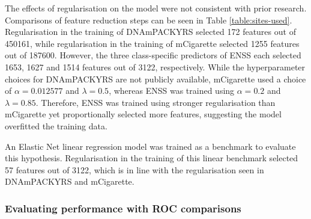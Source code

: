 \documentclass{article} %
\begin{document}
The effects of regularisation on the model were not consistent with prior research. Comparisons of feature reduction steps can be seen in Table \ref{table:sites-used}. Regularisation in the training of DNAmPACKYRS selected 172 features out of \num{450161}, while regularisation in the training of mCigarette selected \num{1255} features out of \num{187600}. However, the three class-specific predictors of ENSS each selected 1653, 1627 and 1514 features out of 3122, respectively. While the hyperparameter choices for DNAmPACKYRS are not publicly available, mCigarette used a choice of \(\alpha = 0.012577\) and \(\lambda = 0.5\), whereas ENSS was trained using \(\alpha = 0.2\) and \(\lambda = 0.85\). Therefore, ENSS was trained using stronger regularisation than mCigarette yet proportionally selected more features, suggesting the model overfitted the training data.

An Elastic Net linear regression model was trained as a benchmark to evaluate this hypothesis. Regularisation in the training of this linear benchmark selected 57 features out of 3122, which is in line with the regularisation seen in DNAmPACKYRS and mCigarette.

\newpage
\subsubsection{Evaluating performance with ROC comparisons}
\end{document}
